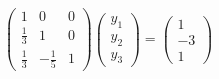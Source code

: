 \documentclass[preview]{standalone}
\begin{document}
\begin{align*}
\begin{pmatrix} 1 & 0 & 0 \\ \frac{1}{3} & 1 & 0 \\ \frac{1}{3} & -\frac{1}{5} & 1 \end{pmatrix}\begin{pmatrix} y_1 \\ y_2 \\ y_3 \end{pmatrix} = \begin{pmatrix} 1 \\ -3 \\ 1 \end{pmatrix}
\end{align*}
\end{document}

